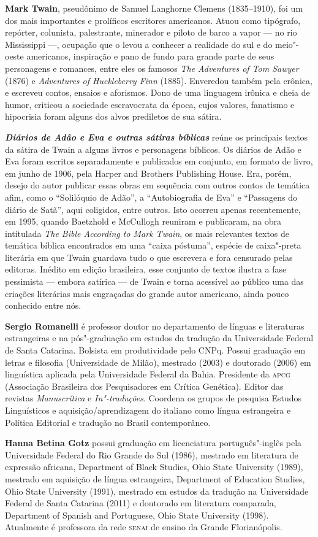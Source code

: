 \textbf{Mark Twain}, pseudônimo de Samuel Langhorne Clemens
(1835--1910), foi um dos mais importantes e prolíficos escritores americanos.
Atuou como tipógrafo, repórter, colunista, palestrante, minerador e piloto de
barco a vapor --- no rio Mississippi ---, ocupação que o levou a conhecer a
realidade do sul e do meio"-oeste americanos, inspiração e pano de fundo para
grande parte de seus personagens e romances, entre eles os famosos \textit{The
Adventures of Tom Sawyer} (1876) e \textit{Adventures of Huckleberry Finn}
(1885). Enveredou também pela crônica, e escreveu contos, ensaios e aforismos.
Dono de uma linguagem irônica e cheia de humor, criticou a sociedade
escravocrata da época, cujos valores, fanatismo e hipocrisia foram alguns dos
alvos prediletos de sua sátira.

\textbf{\textit{Diários de Adão e Eva e outras sátiras bíblicas}} reúne os principais
textos da sátira de Twain a alguns livros e personagens bíblicos. Os diários de
Adão e Eva foram escritos separadamente e publicados em conjunto, em formato de
livro, em junho de 1906, pela Harper and Brothers Publishing House. Era, porém,
desejo do autor publicar essas obras em sequência com outros contos de temática
afim, como o “Solilóquio de Adão'', a “Autobiografia de Eva” e “Passagens do
diário de Satã”, aqui coligidos, entre outros. Isto ocorreu apenas recentemente,
em 1995, quando Baetzhold e McCullogh reuniram e publicaram, na obra intitulada
\textit{The Bible According to Mark Twain}, os mais relevantes textos de
temática bíblica encontrados em uma “caixa póstuma”, espécie de caixa"-preta
literária em que Twain guardava tudo o que escrevera e fora censurado pelas
editoras. Inédito em edição brasileira, esse conjunto de textos ilustra a fase
pessimista --- embora satírica --- de Twain e torna acessível ao público uma das
criações literárias mais engraçadas do grande autor americano, ainda pouco
conhecido entre nós.

\textbf{Sergio Romanelli} é professor doutor no departamento de línguas e
literaturas estrangeiras e na pós"-graduação em estudos da tradução da
Universidade Federal de Santa Catarina. Bolsista em produtividade pelo CNPq.
Possui graduação em letras e filosofia (Universidade de Milão), mestrado (2003)
e doutorado (2006) em linguística aplicada pela Universidade Federal da Bahia.
Presidente da \textsc{apcg} (Associação Brasileira dos Pesquisadores em Crítica
Genética). Editor das revistas \textit{Manuscrítica} e \textit{In"-traduções}.
Coordena os grupos de pesquisa Estudos Linguísticos e aquisição/aprendizagem do
italiano como língua estrangeira e Política Editorial e tradução no Brasil
contemporâneo.

\textbf{Hanna Betina Gotz} possui graduação em licenciatura português"-inglês pela
Universidade Federal do Rio Grande do Sul (1986), mestrado em literatura de
expressão africana, Department of Black Studies, Ohio State University (1989),
mestrado em aquisição de língua estrangeira, Department of Education Studies,
Ohio State University (1991), mestrado em estudos da tradução na Universidade
Federal de Santa Catarina (2011) e doutorado em literatura comparada, Department
of Spanish and Portuguese, Ohio State University (1998). Atualmente é professora
da rede \textsc{senai} de ensino da Grande Florianópolis.

